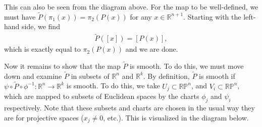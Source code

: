\documentclass{mathnotes}
\begin{document}
This can also be seen from the diagram above. For the map to be well-defined, we must have $\tilde{P}(\pi_1(x))=\pi_2(P(x))$ for any $x\in \mathbb{R}^{n+1}$.
Starting with the left-hand side, we find
\begin{align*}
    \tilde{P}([x])=[P(x)],
\end{align*}
which is exactly equal to $\pi_2(P(x))$ and we are done.

Now it remains to show that the map $\tilde{P}$ is smooth. To do this, we must move down and examine $\tilde{P}$ in subsets of $\mathbb{R}^n$ and $\mathbb{R}^k$.
By definition, $\tilde{P}$ is smooth if $\psi\circ\tilde{P}\circ\phi^{-1}:\mathbb{R}^n\to\mathbb{R}^k$ is smooth. To do this, we take $U_j\subset\mathbb{R}\mathbb{P}^n$,
and $V_i\subset\mathbb{R}\mathbb{P}^n$, which are mapped to subsets of Euclidean spaces by the charts $\phi_j$ and $\psi_i$ respectively. Note that these subsets and
charts are chosen in the usual way they are for projective spaces ($x_j\neq 0$, etc.). This is visualized in the diagram below.
\end{document}
